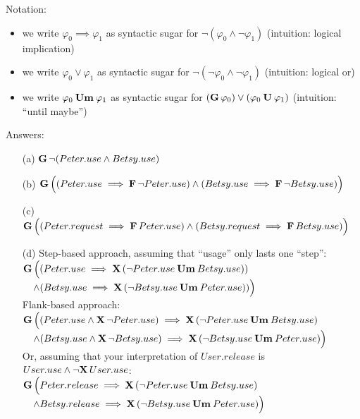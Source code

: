 \documentclass[a4paper,parskip,headheight=38pt]{scrartcl} %
\begin{document}
Notation:
\begin{itemize}
    \item we write $\varphi_0 \implies \varphi_1$ as syntactic sugar for $\neg(\varphi_0 \land \neg \varphi_1)$ (intuition: logical implication)
    \item we write $\varphi_0 \lor \varphi_1$ as syntactic sugar for $\neg(\neg\varphi_0 \land \neg\varphi_1)$ (intuition: logical or)
    \item we write $\varphi_0 \mathbin{\mathbf{{Um}}} \varphi_1$ as syntactic sugar for $(\mathopen{\mathbf{{G}}}\,{} \varphi_0) \lor (\varphi_0 \mathbin{\mathbf{{U}}} \varphi_1)$ (intuition: \enquote{until maybe})
\end{itemize}

Answers:
\begin{itemize}
    \item[(a)] $\mathopen{\mathbf{{G}}}\,{} \neg(Peter.use \land Betsy.use)$
    \item[(b)] $\mathopen{\mathbf{{G}}}\,{} \Big( (Peter.use \implies \mathopen{\mathbf{{F}}}\,{} \neg{}Peter.use) \land (Betsy.use \implies \mathopen{\mathbf{{F}}}\,{} \neg{} Betsy.use) \Big)$
    \item[(c)] $\mathopen{\mathbf{{G}}}\,{} \Big( (Peter.request \implies \mathopen{\mathbf{{F}}}\,{} Peter.use) \land (Betsy.request \implies \mathopen{\mathbf{{F}}}\,{} Betsy.use) \Big)$
    \item[(d)] Step-based approach, assuming that \enquote{usage} only lasts one \enquote{step}: \\
               $\mathopen{\mathbf{{G}}}\,{}\Big( (Peter.use \implies \mathopen{\mathbf{{X}}}\,{}(\neg{}Peter.use \mathbin{\mathbf{{Um}}}{} Betsy.use))$ \\
                    \phantom{x} $\quad \land (Betsy.use \implies \mathopen{\mathbf{{X}}}\,{}(\neg{}Betsy.use \mathbin{\mathbf{{Um}}}{} Peter.use)) \Big)$ \\
               Flank-based approach: \\
               $\mathopen{\mathbf{{G}}}\,{}\Big( (Peter.use \land \mathopen{\mathbf{{X}}}\,{} \neg{}Peter.use) \implies \mathopen{\mathbf{{X}}}\,{} (\neg{}Peter.use \mathbin{\mathbf{{Um}}}{} Betsy.use)$ \\
                   \phantom{x} $\quad \land (Betsy.use \land \mathopen{\mathbf{{X}}}\,{} \neg{}Betsy.use) \implies \mathopen{\mathbf{{X}}}\,{} (\neg{}Betsy.use \mathbin{\mathbf{{Um}}}{} Peter.use) \Big)$ \\
               Or, assuming that your interpretation of $User.release$ is $User.use \land \neg{}\mathopen{\mathbf{{X}}}\,{}User.use$: \\
               $\mathopen{\mathbf{{G}}}\,{}\Big( Peter.release \implies \mathopen{\mathbf{{X}}}\,{} (\neg{}Peter.use \mathbin{\mathbf{{Um}}}{} Betsy.use)$ \\
                   \phantom{x} $\quad \land Betsy.release \implies \mathopen{\mathbf{{X}}}\,{} (\neg{}Betsy.use \mathbin{\mathbf{{Um}}}{} Peter.use) \Big)$ \\
\end{itemize}
\end{document}
